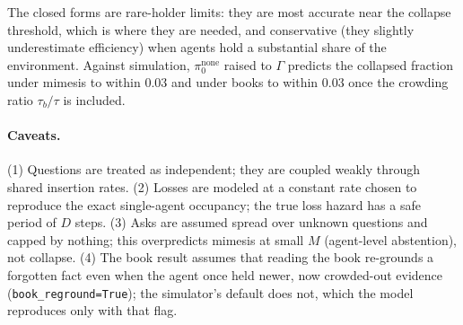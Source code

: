 \documentclass[10pt]{article}
\begin{document}
The closed forms are rare-holder limits: they are most accurate near the collapse threshold, which is where they are needed, and conservative (they slightly underestimate efficiency) when agents hold a substantial share of the environment. Against simulation, $\pi_0^{\text{none}}$ raised to $\Gamma$ predicts the collapsed fraction under mimesis to within $0.03$ and under books to within $0.03$ once the crowding ratio $\tau_b/\tau$ is included.

\paragraph{Caveats.} (1) Questions are treated as independent; they are coupled weakly through shared insertion rates. (2) Losses are modeled at a constant rate chosen to reproduce the exact single-agent occupancy; the true loss hazard has a safe period of $D$ steps. (3) Asks are assumed spread over unknown questions and capped by nothing; this overpredicts mimesis at small $M$ (agent-level abstention), not collapse. (4) The book result assumes that reading the book re-grounds a forgotten fact even when the agent once held newer, now crowded-out evidence (\texttt{book\_reground=True}); the simulator's default does not, which the model reproduces only with that flag.
\end{document}
